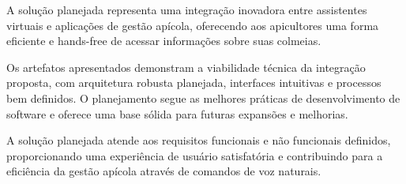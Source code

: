 A solução planejada representa uma integração inovadora entre assistentes virtuais e aplicações de gestão apícola, oferecendo aos apicultores uma forma eficiente e hands-free de acessar informações sobre suas colmeias.

Os artefatos apresentados demonstram a viabilidade técnica da integração proposta, com arquitetura robusta planejada, interfaces intuitivas e processos bem definidos. O planejamento segue as melhores práticas de desenvolvimento de software e oferece uma base sólida para futuras expansões e melhorias.

A solução planejada atende aos requisitos funcionais e não funcionais definidos, proporcionando uma experiência de usuário satisfatória e contribuindo para a eficiência da gestão apícola através de comandos de voz naturais.